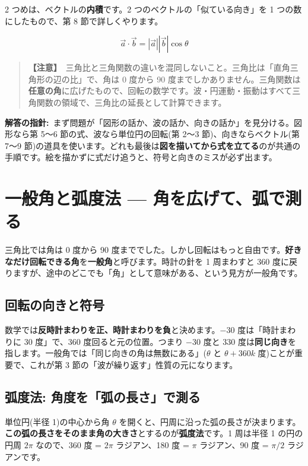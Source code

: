 \documentclass{article}
\begin{document}
2 つめは、ベクトルの\textbf{内積}です。2 つのベクトルの「似ている向き」を 1 つの数にしたもので、第 8 節で詳しくやります。

\[ \vec{a} \cdot \vec{b} = |\vec{a}| |\vec{b}| \cos\theta \]

\begin{quote}
\textbf{【注意】}\ 三角比と三角関数の違いを混同しないこと。三角比は「直角三角形の辺の比」で、角は 0 度から 90 度までしかありません。三角関数は\textbf{任意の角}に広げたもので、回転の数学です。波・円運動・振動はすべて三角関数の領域で、三角比の延長として計算できます。
\end{quote}

\textbf{解答の指針:}\ まず問題が「図形の話か、波の話か、向きの話か」を見分ける。図形なら第 5〜6 節の式、波なら単位円の回転(第 2〜3 節)、向きならベクトル(第 7〜9 節)の道具を使います。どれも最後は\textbf{図を描いてから式を立てる}のが共通の手順です。絵を描かずに式だけ追うと、符号と向きのミスが必ず出ます。

\section{一般角と弧度法 — 角を広げて、弧で測る}

三角比では角は 0 度から 90 度まででした。しかし回転はもっと自由です。\textbf{好きなだけ回転できる角}を\textbf{一般角}と呼びます。時計の針を 1 周まわすと 360 度に戻りますが、途中のどこでも「角」として意味がある、という見方が一般角です。

\subsection{回転の向きと符号}

数学では\textbf{反時計まわりを正、時計まわりを負}と決めます。−30 度は「時計まわりに 30 度」で、360 度回ると元の位置。つまり \( -30 \) 度と \( 330 \) 度は\textbf{同じ向き}を指します。一般角では「同じ向きの角は無数にある」(\( \theta \) と \( \theta + 360k \) 度)ことが重要で、これが第 3 節の「波が繰り返す」性質の元になります。

\subsection{弧度法: 角度を「弧の長さ」で測る}

単位円(半径 1)の中心から角 \( \theta \) を開くと、円周に沿った弧の長さが決まります。\textbf{この弧の長さをそのまま角の大きさ}とするのが\textbf{弧度法}です。1 周は半径 1 の円の円周 \( 2\pi \) なので、360 度 = \( 2\pi \) ラジアン、180 度 = \( \pi \) ラジアン、90 度 = \( \pi/2 \) ラジアンです。
\end{document}
